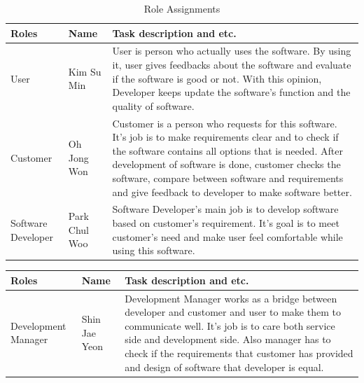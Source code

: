 \documentclass[conference]{IEEEtran}
\begin{document}
  \begin{table}[htbp]
  \renewcommand{\arraystretch}{1.7}
\caption{Role Assignments}
\begin{center}
\begin{tabular}{|p{1.5cm}|p{1.8cm}|p{4.2cm}|}
\hline
\textbf{Roles} & \textbf{{Name}}& \textbf{{Task description and etc.}} \\
\hline
User & Kim Su Min & User is person who actually uses the software. By using it, user gives feedbacks about the software and evaluate if the software is good or not. With this opinion, Developer keeps update the software's function and the quality of software. \\
\hline
Customer & Oh Jong Won & Customer is a person who requests for this software. It's job is to make requirements clear and to check if the software contains all options that is needed. After development of software is done, customer checks the software, compare between software and requirements and give feedback to developer to make software better.   \\
\hline
Software \linebreak Developer& Park Chul Woo & Software Developer's main job is to develop software based on customer's requirement. It's goal is to meet customer's need and make user feel comfortable while using this software.\\
\hline
\end{tabular}
\label{tab1}
\end{center}
\end{table}

  \begin{table}[htbp]
  \renewcommand{\arraystretch}{1.7}
\begin{center}
\begin{tabular}{|p{1.5cm}|p{1.8cm}|p{4.2cm}|}
\hline
\textbf{Roles} & \textbf{{Name}}& \textbf{{Task description and etc.}} \\
\hline
Development Manager & Shin Jae Yeon & Development Manager works as a bridge between developer and customer and user to make them to communicate well. It's job is to care both service side and development side. Also manager has to check if the requirements that customer has provided and design of software that developer is equal. \\
\hline
\end{tabular}
\end{center}
\end{table}

\vspace{5mm}
\end{document}
